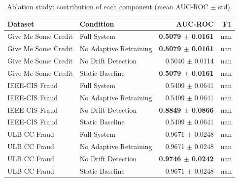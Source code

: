 \begin{table}[ht]
\centering
\caption{Ablation study: contribution of each component (mean AUC-ROC $\pm$ std).}
\label{tab:ablation}
\begin{tabular}{llrr}
\hline
Dataset & Condition & AUC-ROC & F1 \\
\hline
Give Me Some Credit & Full System & \textbf{0.5079 $\pm$ 0.0161} & nan \\
Give Me Some Credit & No Adaptive Retraining & \textbf{0.5079 $\pm$ 0.0161} & nan \\
Give Me Some Credit & No Drift Detection & 0.5040 $\pm$ 0.0114 & nan \\
Give Me Some Credit & Static Baseline & \textbf{0.5079 $\pm$ 0.0161} & nan \\
IEEE-CIS Fraud & Full System & 0.5409 $\pm$ 0.0641 & nan \\
IEEE-CIS Fraud & No Adaptive Retraining & 0.5409 $\pm$ 0.0641 & nan \\
IEEE-CIS Fraud & No Drift Detection & \textbf{0.8849 $\pm$ 0.0866} & nan \\
IEEE-CIS Fraud & Static Baseline & 0.5409 $\pm$ 0.0641 & nan \\
ULB CC Fraud & Full System & 0.9671 $\pm$ 0.0248 & nan \\
ULB CC Fraud & No Adaptive Retraining & 0.9671 $\pm$ 0.0248 & nan \\
ULB CC Fraud & No Drift Detection & \textbf{0.9746 $\pm$ 0.0242} & nan \\
ULB CC Fraud & Static Baseline & 0.9671 $\pm$ 0.0248 & nan \\
\hline
\end{tabular}
\end{table}